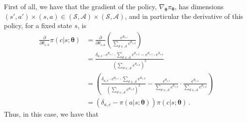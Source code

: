First of all, we have that the gradient of the policy, $\nabla_{\boldsymbol \theta} \pi_{\boldsymbol \theta}$, has dimensions $(s', a') \times (s,a) \in (\mathcal S, \mathcal A) \times (\mathcal S, \mathcal A)$, and in particular the derivative of this policy, for a fixed state $s$, is
\begin{equation*}
    \begin{aligned}
        \frac{\partial}{\partial \theta_{s, a}} \pi(c | s; \boldsymbol \theta)
        &= \frac{\partial}{\partial \theta_{s, a}} \left(\frac{e^{\theta_{s,c} }}{\sum_{d \in \mathcal A} e^{\theta_{s,d} }} \right) \\
        &= \frac{\delta_{a,c} \cdot e^{\theta_{s,c} } \cdot \sum_{d \in \mathcal A} e^{\theta_{s,d} } -  e^{\theta_{s,c} } \cdot e^{\theta_{s, a} }}{(\sum_{d \in \mathcal A} e^{\theta_{s,d}})^2} \\
        &= \left(\frac{\delta_{a,c} \cdot e^{\theta_{s,c} } \cdot \sum_{d \in \mathcal A} e^{\theta_{s,d} }}{(\sum_{d \in \mathcal A} e^{\theta_{s,d} })^2} - \frac{e^{\theta_{s,c} }}{\sum_{d \in \mathcal A} e^{\theta_{s,d} }}\cdot\frac{e^{\theta_{s,a} }}{\sum_{d \in \mathcal A} e^{\theta_{s,d} }} \right) \\
        &= \left(\delta_{a,c} - \pi(a | s; \boldsymbol \theta) \right) \pi(c|s; \boldsymbol \theta)  \, .
    \end{aligned}
\end{equation*}
Thus, in this case, we have that

